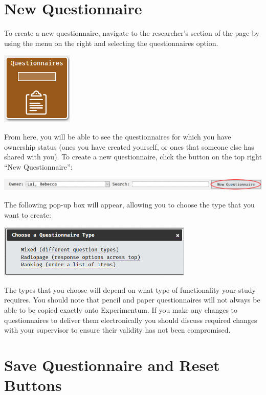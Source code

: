 \documentclass[]{book}
\begin{document}
\hypertarget{new-questionnaire}{%
\section{New Questionnaire}\label{new-questionnaire}}

To create a new questionnaire, navigate to the researcher's section of the page by using the menu on the right and selecting the questionnaires option.

\includegraphics{images/screenshots/questionnaire_button.png}

From here, you will be able to see the questionnaires for which you have ownership status (ones you have created yourself, or ones that someone else has shared with you). To create a new questionnaire, click the button on the top right ``New Questionnaire'':

\includegraphics{images/screenshots/new_questionnaire.png}

The following pop-up box will appear, allowing you to choose the type that you want to create:

\includegraphics{images/screenshots/questionnaire_dialogue.png}

The types that you choose will depend on what type of functionality your study requires. You should note that pencil and paper questionnaires will not always be able to be copied exactly onto Experimentum. If you make any changes to questionnaires to deliver them electronically you should discuss required changes with your supervisor to ensure their validity has not been compromised.

\hypertarget{save-questionnaire-and-reset-buttons}{%
\section{Save Questionnaire and Reset Buttons}\label{save-questionnaire-and-reset-buttons}}
\end{document}
